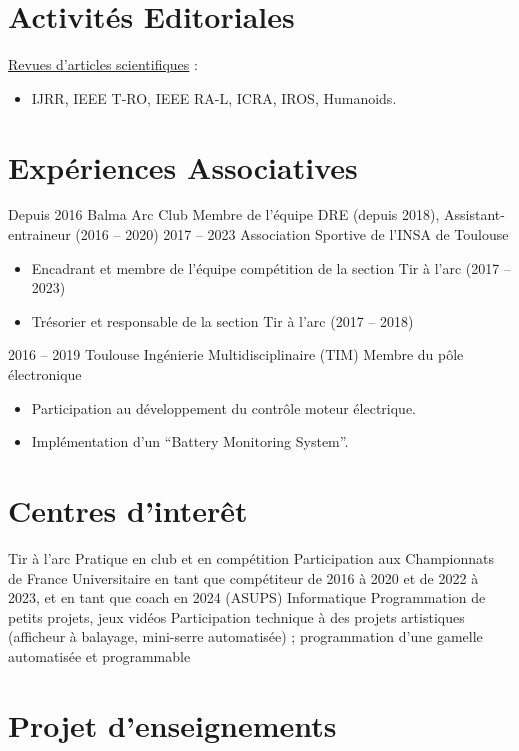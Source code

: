 \documentclass[11pt,a4paper,sans]{moderncv}         %
\newcommand{\items}{\item \hspace{2mm}}
\begin{document}
\section{Activit\'es  Editoriales}
\large{\underline{Revues d'articles scientifiques} :}
\begin{itemize}%
\items IJRR, IEEE T-RO, IEEE RA-L, ICRA, IROS, Humanoids.
\end{itemize}

\section{Exp\'eriences Associatives}
\cventry
{Depuis 2016}
{Balma Arc Club}
{Membre de l'\'equipe DRE (depuis 2018), Assistant-entraineur (2016 -- 2020)}
{}
{}
{}
%
\cventry
{2017 -- 2023}
{Association Sportive de l'INSA de Toulouse}
{}
{}
{}
{
  \begin{itemize}
    \item Encadrant et membre de l'\'equipe comp\'etition de la section Tir \`a l'arc (2017 -- 2023)
    \item Tr\'esorier et responsable de la section Tir \`a l'arc (2017 -- 2018)
  \end{itemize}
}
%
\cventry
{2016 -- 2019}
{Toulouse Ing\'enierie Multidisciplinaire (TIM)}
{Membre du p\^ole \'electronique}
{}
{}
{
  \begin{itemize}
    \item Participation au d\'eveloppement du contr\^ole moteur \'electrique.
    \item Impl\'ementation d'un ``Battery Monitoring System''.
  \end{itemize}
}
%

\section{Centres d'inter\^et}

\cventry
{Tir \`a l'arc}
{Pratique en club et en comp\'etition}
{Participation aux Championnats de France Universitaire en tant que compétiteur de 2016 \`a 2020 et de 2022 \`a 2023, et en tant que coach en 2024 (ASUPS)}
{}
{}
{}
%
\cventry
{Informatique}
{Programmation de petits projets, jeux vid\'eos}
{Participation technique \`a des projets artistiques (afficheur \`a balayage, mini-serre automatis\'ee) ; programmation d'une gamelle automatis\'ee et programmable}
{}
{}
{}
%


\section{Projet d'enseignements}
\end{document}

